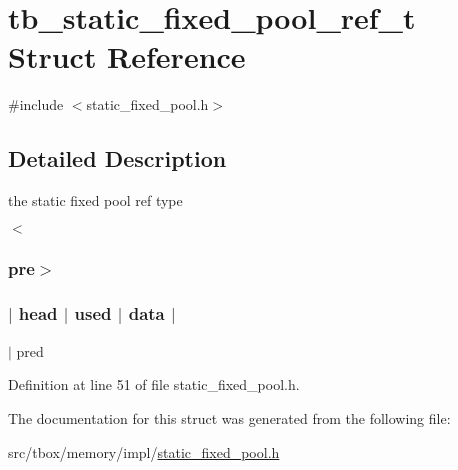 \hypertarget{structtb__static__fixed__pool__ref__t}{\section{tb\-\_\-static\-\_\-fixed\-\_\-pool\-\_\-ref\-\_\-t Struct Reference}
\label{structtb__static__fixed__pool__ref__t}
}


{\ttfamily \#include $<$static\-\_\-fixed\-\_\-pool.\-h$>$}



\subsection{Detailed Description}
the static fixed pool ref type

$<$\subsubsection*{pre$>$ }

\subsubsection*{$\vert$ head $\vert$ used $\vert$ data $\vert$ }

$\vert$ pred  

Definition at line 51 of file static\-\_\-fixed\-\_\-pool.\-h.



The documentation for this struct was generated from the following file\-:\begin{DoxyCompactItemize}
\item 
src/tbox/memory/impl/\hyperlink{static__fixed__pool_8h}{static\-\_\-fixed\-\_\-pool.\-h}\end{DoxyCompactItemize}
